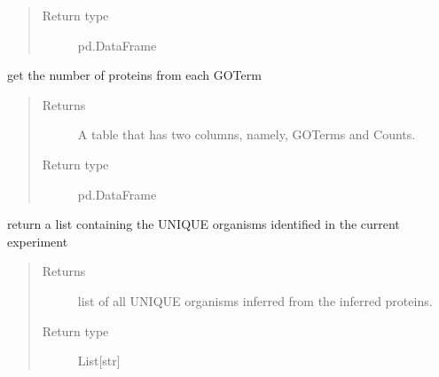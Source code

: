 \documentclass[letterpaper,10pt,english]{sphinxmanual}
\begin{document}
\begin{fulllineitems}
\begin{fulllineitems}
\begin{quote}
\begin{description}
\item[{Return type}] \leavevmode
pd.DataFrame

\end{description}\end{quote}

\end{fulllineitems}


\begin{fulllineitems}
\label{\detokenize{IPTK.Classes:IPTK.Classes.Experiment.Experiment.get_number_of_proteins_per_go_term}}
get the number of proteins from each GO\sphinxhyphen{}Term
\begin{quote}\begin{description}
\item[{Returns}] \leavevmode
A table that has two columns, namely, GO\sphinxhyphen{}Terms and Counts.

\item[{Return type}] \leavevmode
pd.DataFrame

\end{description}\end{quote}

\end{fulllineitems}


\begin{fulllineitems}
\label{\detokenize{IPTK.Classes:IPTK.Classes.Experiment.Experiment.get_orgs}}
return a list containing the UNIQUE organisms identified in the current experiment
\begin{quote}\begin{description}
\item[{Returns}] \leavevmode
list of all UNIQUE organisms inferred from the inferred proteins.

\item[{Return type}] \leavevmode
List{[}str{]}


\end{description}
\end{quote}
\end{fulllineitems}
\end{fulllineitems}
\end{document}

